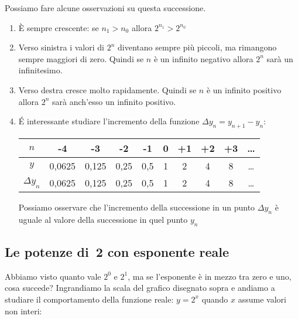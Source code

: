 \begin{osservazione}
Possiamo fare alcune osservazioni su questa successione.

\begin{enumerate}
 \item 
  È sempre crescente: se \(n_1 > n_0\) allora \(2^{n_1} > 2^{n_0}\)
 \item 
  Verso sinistra i valori di \(2^n\) diventano sempre più piccoli, ma 
rimangono 
  sempre maggiori di zero. Quindi se \(n\) è un infinito negativo 
  allora \(2^n\) sarà un infinitesimo.
 \item 
  Verso destra cresce molto rapidamente. Quindi se \(n\) è un infinito 
positivo 
  allora \(2^n\) sarà anch'esso un infinito positivo.
 \item 
  \'E interessante studiare l'incremento della funzione \;\(\Delta y_n = 
y_{n+1}-y_n\):
\begin{center}
\renewcommand\arraystretch{1.8}
\begin{tabular}{c|ccccccccc}
\(n\) & -4    & -3    & -2   & -1  & 0 & +1 & +2 & +3  & \dots \\
\hline 
\(y\) & 0,0625 & 0,125 & 0,25 & 0,5 & 1 & 2  & 4  & 8 & \dots\\
\hline
\(\Delta y_n\) & 
  0,0625 & 0,125 & 0,25 & 0,5 & 1 & 2  & 4  & 8& \dots \\
\end{tabular}
\end{center}

  Possiamo osservare che l'incremento della successione in un punto 
\(\Delta y_n\)
  è uguale al valore della successione in quel punto \(y_n\)

\end{enumerate}
\end{osservazione}

\subsection{Le potenze di~2 con esponente reale}
\label{subsec:esplog_potdue}

Abbiamo visto quanto vale \(2^0\) e \(2^1\), ma se l'esponente è in mezzo 
tra zero e uno, cosa succede? Ingrandiamo la scala del grafico disegnato 
sopra 
e andiamo a studiare il comportamento della funzione reale: \(y=2^x\) 
quando 
\(x\) assume valori non interi:

